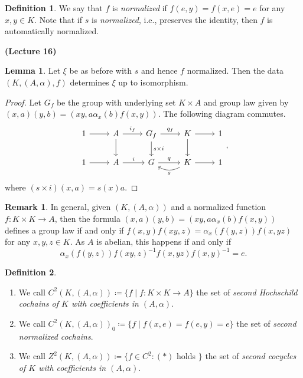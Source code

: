\documentclass[10pt,letterpaper,cm]{nupset}
\theoremstyle{definition}
\newtheorem*{definition}{Definition}
\newtheorem{remark}{Remark}
\newtheorem{lemma}{Lemma}
\newcommand{\1}{\mathbf{1}}
\newcommand{\0}{\vec 0}
\begin{document}
\begin{definition}
We say that $f$ is \textit{normalized} if $f(e, y) = f(x, e) =e$ for any $x,y \in K$. Note that if $s$ is \textit{normalized}, i.e., preserves the identity, then $f$ is automatically normalized.
\end{definition}

\begin{center}
{\textbf{(Lecture 16)}}
\end{center}

\begin{lemma} 
Let $\xi$ be as before with $s$ and hence $f$ normalized. Then the data $(K, (A, \alpha), f)$ determines $\xi$ up to isomorphism.
\end{lemma}
\begin{proof}
Let $G_f$ be the group with underlying set $K \times A$ and group law given by $(x, a)(y, b) = (xy, a \alpha_x(b)f(x,y))$. The following diagram commutes.
\[
\begin{tikzcd}
1 \arrow[r] & A \arrow[r, "i_f"] \arrow[d] & G_f \arrow[d, "s\times i"] \arrow[r, "q_f"] & K \arrow[r] \arrow[d] & 1 \\
1 \arrow[r] & A \arrow[r, "i"] & G \arrow[r, "q"] & K \arrow[r] \arrow[l, "s", bend left] & 1
\end{tikzcd},
\]
where $(s\times i)(x, a) = s(x)a$.
\end{proof}

\begin{remark}
In general, given $(K, (A, \alpha))$ and a normalized function $f: K \times K \to A$, then the formula $(x, a)(y, b) = (xy, a \alpha_x(b)f(x,y))$ defines a group law if and only if $f(x,y)f(xy, z) = \alpha_x(f(y,z))f(x, yz)$ for any $x, y, z \in K$. As $A$ is abelian, this happens if and only if  
\[ 
\tag{$\ast$}\alpha_x(f(y, z))f(xy, z)^{-1} f(x, yz)f(x, y)^{-1} = e.
\]
\end{remark}

\begin{definition} $ $
\begin{enumerate}
\item We call $C^2(K, (A, \alpha))\coloneqq  \{f \mid f: K \times K \to A\}$ the set of \textit{second Hochschild cochains of $K$ with coefficients in $(A, \alpha)$}. 
\item We call $C^2(K, (A, \alpha))_0 \coloneqq  \{f \mid f(x, e) = f(e, y) =e\}$ the set of \textit{second normalized cochains}.
\item We call $Z^2(K, (A, \alpha)) \coloneqq  \{f \in C^2 : (\ast)$ holds $\}$ the set of \textit{second cocycles of $K$ with coefficients in $(A, \alpha)$}.
\end{enumerate}
\end{definition}
\end{document}
